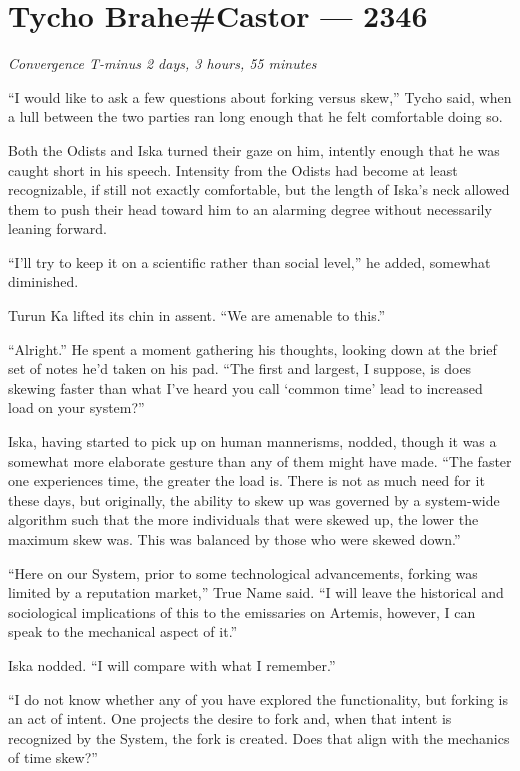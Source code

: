 \hypertarget{tycho-brahecastor-2346}{%
\chapter{Tycho Brahe\#Castor — 2346}\label{tycho-brahecastor-2346}}

\begin{center}
\emph{Convergence T-minus 2 days, 3 hours, 55 minutes}
\end{center}

\noindent ``I would like to ask a few questions about forking versus skew,'' Tycho said, when a lull between the two parties ran long enough that he felt comfortable doing so.

Both the Odists and Iska turned their gaze on him, intently enough that he was caught short in his speech. Intensity from the Odists had become at least recognizable, if still not exactly comfortable, but the length of Iska's neck allowed them to push their head toward him to an alarming degree without necessarily leaning forward.

``I'll try to keep it on a scientific rather than social level,'' he added, somewhat diminished.

Turun Ka lifted its chin in assent. ``We are amenable to this.''

``Alright.'' He spent a moment gathering his thoughts, looking down at the brief set of notes he'd taken on his pad. ``The first and largest, I suppose, is does skewing faster than what I've heard you call `common time' lead to increased load on your system?''

Iska, having started to pick up on human mannerisms, nodded, though it was a somewhat more elaborate gesture than any of them might have made. ``The faster one experiences time, the greater the load is. There is not as much need for it these days, but originally, the ability to skew up was governed by a system-wide algorithm such that the more individuals that were skewed up, the lower the maximum skew was. This was balanced by those who were skewed down.''

``Here on our System, prior to some technological advancements, forking was limited by a reputation market,'' True Name said. ``I will leave the historical and sociological implications of this to the emissaries on Artemis, however, I can speak to the mechanical aspect of it.''

Iska nodded. ``I will compare with what I remember.''

``I do not know whether any of you have explored the functionality, but forking is an act of intent. One projects the desire to fork and, when that intent is recognized by the System, the fork is created. Does that align with the mechanics of time skew?''

